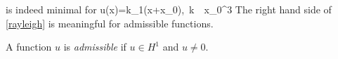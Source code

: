 is indeed minimal for %
\be\label{uts}
u(x)=k\phi_1(x+x_0),\quad{}~k~~x_0\in\R^3
\ee
The right hand side of \eqref{rayleigh} is
meaningful for admissible functions.

\begin{definition} 
    A function $u$ is \emph{admissible} if $u\in H^1$ and $u\neq 0$.
\end{definition}
